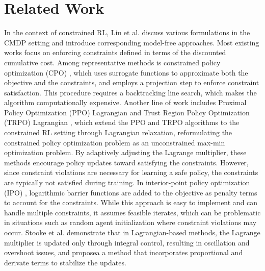 \section{Related Work}

In the context of constrained RL, Liu et al. \cite{liu2021policy} discuss various formulations in the CMDP setting and introduce corresponding model-free approaches.
Most existing works focus on enforcing constraints defined in terms of the discounted cumulative cost.
Among representative methods is constrained policy optimization (CPO) \cite{achiam2017constrained}, which uses surrogate functions to approximate both the objective and the constraints, and employs a projection step to enforce constraint satisfaction.
This procedure requires a backtracking line search, which makes the algorithm computationally expensive.
Another line of work includes Proximal Policy Optimization (PPO) Lagrangian and Trust Region Policy Optimization (TRPO) Lagrangian \cite{ray2019benchmarking}, which extend the PPO \cite{schulman2017proximal} and TRPO \cite{schulman2015trust} algorithms to the constrained RL setting through Lagrangian relaxation, reformulating the constrained policy optimization problem as an unconstrained max-min optimization problem.
By adaptively adjusting the Lagrange multiplier, these methods encourage policy updates toward satisfying the constraints.
However, since constraint violations are necessary for learning a safe policy, the constraints are typically not satisfied during training.
In interior-point policy optimization (IPO) \cite{liu2020ipo}, logarithmic barrier functions are added to the objective as penalty terms to account for the constraints.
While this approach is easy to implement and can handle multiple constraints, it assumes feasible iterates, which can be problematic in situations such as random agent initialization where constraint violations may occur.
Stooke et al. \cite{stooke2020responsive} demonstrate that in Lagrangian-based methods, the Lagrange multiplier is updated only through integral control, resulting in oscillation and overshoot issues, and proposea a method that incorporates proportional and derivate terms to stabilize the updates.